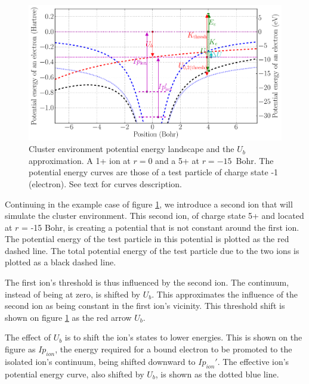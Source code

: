 \begin{figure}
    \begin{center}
    \includegraphics[width=0.98\columnwidth]{figures/potential_landscape}
    \end{center}
    \caption{\label{fig:md:Vb}Cluster environment potential energy landscape
             and the $U_b$ approximation. A 1+ ion at $r=0$ and a 5+ at
             $r=-15$~Bohr. The potential energy curves are those of a test
             particle of charge state -1 (electron). See text for curves
             description.}
\end{figure}


Continuing in the example case of figure \ref{fig:md:Vb}, we introduce a
second ion that will simulate the cluster environment. This second ion, of
charge state 5+ and located at $r$ = -15 Bohr, is creating a
potential that is not constant around the first ion. The potential energy of
the test particle in this potential is plotted as the red dashed line. The total
potential energy of the test particle due to the two ions is plotted as a black
dashed line.

The first ion's threshold is thus influenced by the second ion. The continuum,
instead of being at zero, is shifted by $U_b$. This approximates the
influence of the second ion as being constant in the first ion's vicinity. This
threshold shift is shown on figure \ref{fig:md:Vb} as the red arrow $U_b$.

The effect of $U_b$ is to shift the ion's states to lower energies. This is
shown on the figure as $Ip_{ion}$, the energy required for a bound electron
to be promoted to the isolated ion's continuum, being shifted downward to
$Ip_{ion}'$. The effective ion's potential energy curve, also shifted by $U_b$,
is shown as the dotted blue line.

